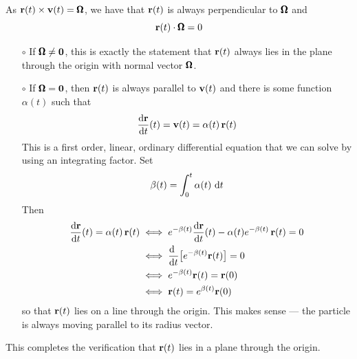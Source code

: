 As $\mathbf{r}(t)\times\mathbf{v}(t)=\pmb{\Omega}$, we have that
$\mathbf{r}(t)$ is always perpendicular to $\pmb{\Omega}$ and
\begin{equation*}
\mathbf{r}(t)\cdot\pmb{\Omega} =0
\end{equation*}
\begin{itemize}\itemsep1pt \parskip0pt  %
\item[$\circ$]
If $\pmb{\Omega}\ne \mathbf{0}$, this is exactly the statement that $\mathbf{r}(t)$ always 
lies in the plane through the origin with normal vector $\pmb{\Omega}$.
\item[$\circ$]
If $\pmb{\Omega}=\mathbf{0}$, then $\mathbf{r}(t)$ is always parallel to $\mathbf{v}(t)$ and there
is some function $\alpha(t)$ such that
\begin{equation*}
\diff{\vr}{t}(t) = \vv(t) = \alpha(t)\,\vr(t)
\end{equation*}
This is a first order, linear, ordinary differential equation that we can solve
by using an integrating factor. Set
\begin{equation*}
\beta(t) = \int_0^t\alpha(t)\ \dee{t}
\end{equation*}
Then
\begin{align*}
\diff{\vr}{t}(t) = \alpha(t)\,\vr(t)
&\iff e^{-\beta(t)} \diff{\vr}{t}(t) -\alpha(t)e^{-\beta(t)}\,\vr(t)=0\\
&\iff \diff{\ }{t}\big[e^{-\beta(t)}\vr(t)\big] = 0\\
&\iff e^{-\beta(t)}\vr(t) = \vr(0)\\
&\iff \vr(t) =  e^{\beta(t)}\vr(0)
\end{align*}
so that $\mathbf{r}(t)$ lies on a line through the origin. This makes sense ---
the particle is always moving parallel to its radius vector.
\end{itemize}
This completes the verification that $\mathbf{r}(t)$ lies in a plane through 
the origin.

